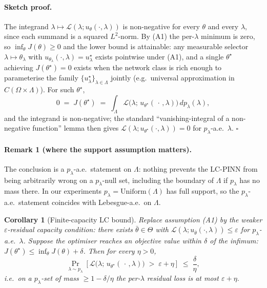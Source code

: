 \documentclass{article}
\theoremstyle{plain}
\newtheorem{corollary}[theorem]{Corollary}
\theoremstyle{definition}
\theoremstyle{remark}
\begin{document}
\paragraph{Sketch proof.}
The integrand
$\lambda \mapsto \mathcal{L}(\lambda; u_\theta(\cdot,\lambda))$ is
non-negative for every $\theta$ and every $\lambda$, since each summand
is a squared $L^2$-norm. By (A1) the per-$\lambda$ minimum is zero, so
$\inf_\theta J(\theta) \ge 0$ and the lower bound is attainable: any
measurable selector $\lambda \mapsto \theta_\lambda$ with
$u_{\theta_\lambda}(\cdot, \lambda) = u^\star_\lambda$ exists pointwise
under (A1), and a single $\theta^\star$ achieving $J(\theta^\star) = 0$
exists when the network class is rich enough to parameterise the family
$\{u^\star_\lambda\}_{\lambda \in \Lambda}$ jointly (e.g.\ universal
approximation in $C(\Omega \times \Lambda)$). For such $\theta^\star$,
\[
   0 \;=\; J(\theta^\star)
   \;=\; \int_{\Lambda}
            \mathcal{L}\bigl(\lambda;\, u_{\theta^\star}(\,\cdot\,, \lambda)\bigr)
         \, dp_\lambda(\lambda) ,
\]
and the integrand is non-negative; the standard
``vanishing-integral of a non-negative function'' lemma then gives
$\mathcal{L}(\lambda; u_{\theta^\star}(\cdot,\lambda)) = 0$ for
$p_\lambda$-a.e.~$\lambda$. \hfill$\square$

\paragraph{Remark 1 (where the support assumption matters).}
The conclusion is a $p_\lambda$-a.e.\ statement on $\Lambda$: nothing
prevents the LC-PINN from being arbitrarily wrong on a
$p_\lambda$-null set, including the boundary of $\Lambda$ if
$p_\lambda$ has no mass there. In our experiments
$p_\lambda = \mathrm{Uniform}(\Lambda)$ has full support, so the
$p_\lambda$-a.e.\ statement coincides with Lebesgue-a.e.\ on
$\Lambda$.

\begin{corollary}[Finite-capacity LC bound]
\label{cor:finite-capacity}
Replace assumption \textnormal{(A1)} by the weaker
\emph{$\varepsilon$-residual capacity} condition: there exists
$\bar\theta \in \Theta$ with
$\mathcal{L}(\lambda; u_{\bar\theta}(\cdot,\lambda)) \le \varepsilon$
for $p_\lambda$-a.e.\ $\lambda$. Suppose the optimiser reaches an
objective value within $\delta$ of the infimum:
$J(\theta^\star) \le \inf_\theta J(\theta) + \delta$. Then for every
$\eta > 0$,
\[
   \Pr_{\lambda \sim p_\lambda}\!\left[
      \mathcal{L}\bigl(\lambda;\, u_{\theta^\star}(\,\cdot\,, \lambda)\bigr)
      \;>\; \varepsilon + \eta
   \right]
   \;\le\; \frac{\delta}{\eta} ,
\]
i.e.\ on a $p_\lambda$-set of mass $\ge 1 - \delta/\eta$ the
per-$\lambda$ residual loss is at most $\varepsilon + \eta$.
\end{corollary}
\end{document}
